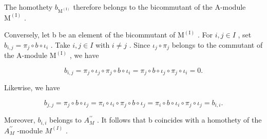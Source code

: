 The homothety \(b_{\mathrm{M}^{(\mathrm{I})}}\) therefore belongs to the bicommutant of the A-module \(\mathrm{M}^{(\mathrm{I})}\) .

Conversely, let b be an element of the bicommutant of \(\mathrm{M}^{(\mathrm{I})}\) . For \(i,j\in I\) , set \(b_{i,j}=\pi_{j}\circ b\circ\iota_{i}\) . Take \(i,j\in I\) with \(i\neq j\) . Since \(\iota_{j}\circ\pi_{j}\) belongs to the commutant of the A-module \(\mathrm{M}^{(\mathrm{I})}\) , we have

\[
b _ {i, j} = \pi_ {j} \circ \iota_ {j} \circ \pi_ {j} \circ b \circ \iota_ {i} = \pi_ {j} \circ b \circ \iota_ {j} \circ \pi_ {j} \circ \iota_ {i} = 0.
\]

Likewise, we have

\[
b _ {j, j} = \pi_ {j} \circ b \circ \iota_ {j} = \pi_ {i} \circ \iota_ {i} \circ \pi_ {j} \circ b \circ \iota_ {j} = \pi_ {i} \circ b \circ \iota_ {i} \circ \pi_ {j} \circ \iota_ {j} = b _ {i, i}.
\]

Moreover, \(b_{i,i}\) belongs to \(A_{M}^{\prime\prime}\) . It follows that b coincides with a homothety of the \(A_{M}^{\prime\prime}\) -module \(M^{(I)}\) .

